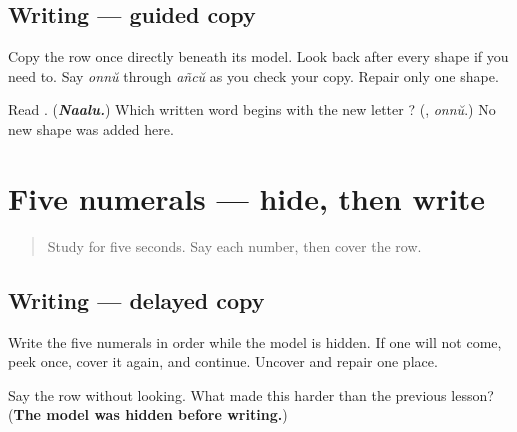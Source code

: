 \subsection*{Writing — guided copy}

Copy the row once directly beneath its model. Look back after every shape if you need to. Say \emph{onnŭ} through \emph{añcŭ} as you check your copy. Repair only one shape.

\begin{tcolorbox}[breakable,colback=teal!4,colframe=teal!35!black,title={Before you move on}]
Read \textbf{}. (\emph{\textbf{Naalu.}}) Which written word begins with the new letter \textbf{}? (\textbf{}, \emph{onnŭ}.) No new shape was added here.
\end{tcolorbox}
\section[\texorpdfstring{\ml{൧} \ml{൨} \ml{൩} \ml{൪} \ml{൫} (one to five)}{൧ ൨ ൩ ൪ ൫ (one to five)}]{Five numerals — hide, then write}

\label{lesson:ML-W07-numbers-1-5-delayed-copy}



\begin{quote}
Study \textbf{    } for five seconds. Say each number, then cover the row.
\end{quote}

\subsection*{Writing — delayed copy}

Write the five numerals in order while the model is hidden. If one will not come, peek once, cover it again, and continue. Uncover and repair one place.

\begin{tcolorbox}[breakable,colback=teal!4,colframe=teal!35!black,title={Before you move on}]
Say the row without looking. What made this harder than the previous lesson? (\textbf{The model was hidden before writing.})
\end{tcolorbox}
